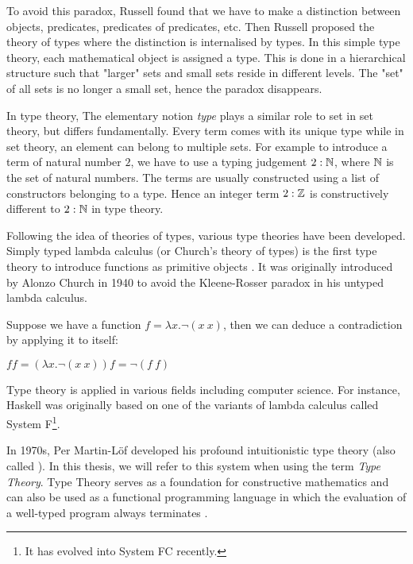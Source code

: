 To avoid this paradox, Russell found that we have to make a distinction between objects, predicates, predicates of predicates, etc. Then Russell proposed the theory of types \cite{rus:1903} where the distinction is internalised by types.
In this simple type theory, each mathematical object is assigned a type. This is done in a hierarchical structure such that "larger" sets and small sets reside in different levels. The "set" of all
sets is no longer a small set, hence the
paradox disappears.

In type theory, The elementary notion \emph{type} plays a similar role to set in set theory, but differs fundamentally. Every term comes with its unique type while in set theory, an element can belong to multiple sets.
For example to introduce a term of natural number $2$, we have to use
a typing judgement $2:\mathbb{N}$, where $\mathbb{N}$ is the set of natural
numbers. The terms are usually constructed using a list of
constructors belonging to a type. Hence an integer term $2 : \mathbb{Z}$ is constructively different to $2:\mathbb{N}$ in type theory.

Following the idea of theories of types, various type theories have been developed.
Simply typed lambda calculus (or Church's theory of types) is the first type theory to introduce functions as primitive objects \cite{sep-type-theory}. It was originally introduced by Alonzo Church in 1940 to avoid the Kleene-Rosser paradox \cite{kleene1935inconsistency} in his untyped lambda calculus.

\begin{example}
Suppose we have a function $f = \lambda x . \neg (x ~ x) $, then we can deduce a contradiction by applying it to itself:

$f f = (\lambda x . \neg (x ~ x)) f = \neg (f ~ f)$
\end{example}

Type theory is applied in various fields including computer science. For instance, Haskell was originally based on one of the variants of lambda calculus called System F\footnote{It has evolved into System FC recently.}. 



In 1970s, Per Martin-L\"{o}f \cite{per:71,per:82} developed his
profound intuitionistic type theory (also called \mltt). In this
thesis, we will refer to this system when using the term \emph{Type Theory}.
Type Theory serves as a foundation for constructive mathematics
\cite{martin1984intuitionistic} and can also be used as a functional programming language \cite{DBLP:dblp_journals/tcs/Troelstra99} in
which the evaluation of a well-typed program always terminates \cite{nor:90}. 


